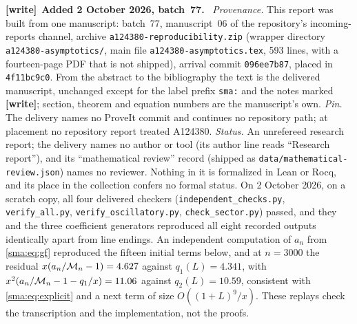 \documentclass[11pt,letterpaper]{article}
\numberwithin{equation}{section}
\newenvironment{writenote}[1][]{\par\smallskip\begingroup\small
 \noindent\textbf{[write]}\if\relax\detokenize{#1}\relax\else~\textbf{#1.}\fi\ }%
 {\par\endgroup\smallskip}
\begin{document}
\begin{writenote}[Added 2 October 2026, batch~77]
\emph{Provenance.} This report was built from one manuscript: batch~77,
manuscript~06 of the repository's incoming-reports channel, archive
\nolinkurl{a124380-reproducibility.zip} (wrapper directory
\nolinkurl{a124380-asymptotics/}, main file
\nolinkurl{a124380-asymptotics.tex}, 593 lines, with a fourteen-page PDF that
is not shipped), arrival commit \texttt{096ee7b87}, placed in
\texttt{4f11bc9c0}. From the abstract to the bibliography the text is the
delivered manuscript, unchanged except for the label prefix \texttt{sma:} and
the notes marked \textbf{[write]}; section, theorem and equation numbers are
the manuscript's own.
\emph{Pin.} The delivery names no ProveIt commit and continues no repository
path; at placement no repository report treated A124380.
\emph{Status.} An unrefereed research report; the delivery names no author
or tool (its author line reads ``Research report''), and its
``mathematical review'' record (shipped as
\nolinkurl{data/mathematical-review.json}) names no reviewer. Nothing in it
is formalized in Lean or Rocq, and its place in the collection confers no
formal status. On 2 October 2026, on a scratch copy, all four delivered
checkers (\texttt{independent\_checks.py}, \texttt{verify\_all.py},
\texttt{verify\_oscillatory.py}, \texttt{check\_sector.py}) passed, and they
and the three coefficient generators reproduced all eight recorded outputs
identically apart from line endings. An independent computation of $a_n$
from \eqref{sma:eq:gf} reproduced the fifteen initial terms below, and at
$n=3000$ the residual $x(a_n/\mathcal M_n-1)=4.627$ against $q_1(L)=4.341$, with
$x^2(a_n/\mathcal M_n-1-q_1/x)=11.06$ against $q_2(L)=10.59$, consistent with
\eqref{sma:eq:explicit} and a next term of size $O((1+L)^9/x)$. These replays
check the transcription and the implementation, not the proofs.
\end{writenote}
\end{document}
